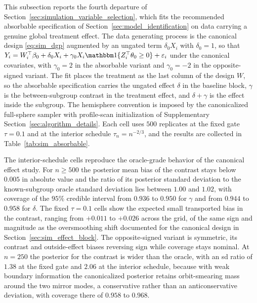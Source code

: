 \documentclass[11pt]{article}
\theoremstyle{definition}
\theoremstyle{plain}
\begin{document}
This subsection reports the fourth departure of Section~\ref{sec:simulation_variable_selection}, which fits the recommended absorbable specification of Section~\ref{sec:model_identification} on data carrying a genuine global treatment effect. The data generating process is the canonical design \eqref{eq:sim_dgp} augmented by an ungated term $\delta_0 X_i$ with $\delta_0=1$, so that $Y_i=W_i^\top\beta_0+\delta_0 X_i+\gamma_0 X_i\mathbbm 1\{Z_i^\top\theta_0\ge0\}+\varepsilon_i$ under the canonical covariates, with $\gamma_0=2$ in the absorbable variant and $\gamma_0=-2$ in the opposite-signed variant. The fit places the treatment as the last column of the design $W$, so the absorbable specification carries the ungated effect $\delta$ in the baseline block, $\gamma$ is the between-subgroup contrast in the treatment effect, and $\delta+\gamma$ is the effect inside the subgroup. The hemisphere convention is imposed by the canonicalized full-sphere sampler with profile-scan initialization of Supplementary Section~\ref{sec:algorithm_details}. Each cell uses $500$ replicates at the fixed gate $\tau=0.1$ and at the interior schedule $\tau_n=n^{-2/3}$, and the results are collected in Table~\ref{tab:sim_absorbable}.

The interior-schedule cells reproduce the oracle-grade behavior of the canonical effect study. For $n\ge500$ the posterior mean bias of the contrast stays below $0.005$ in absolute value and the ratio of its posterior standard deviation to the known-subgroup oracle standard deviation lies between $1.00$ and $1.02$, with coverage of the $95\%$ credible interval from $0.936$ to $0.950$ for $\gamma$ and from $0.944$ to $0.958$ for $\delta$. The fixed $\tau=0.1$ cells show the expected small transported bias in the contrast, ranging from $+0.011$ to $+0.026$ across the grid, of the same sign and magnitude as the oversmoothing shift documented for the canonical design in Section~\ref{sec:sim_effect_block}. The opposite-signed variant is symmetric, its contrast and outside-effect biases reversing sign while coverage stays nominal. At $n=250$ the posterior for the contrast is wider than the oracle, with an sd ratio of $1.38$ at the fixed gate and $2.06$ at the interior schedule, because with weak boundary information the canonicalized posterior retains orbit-smearing mass around the two mirror modes, a conservative rather than an anticonservative deviation, with coverage there of $0.958$ to $0.968$.
\end{document}
